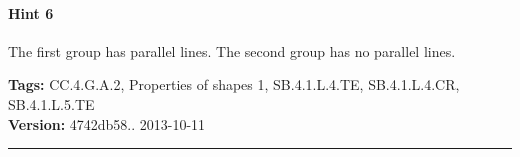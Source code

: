 \documentclass[twocolumn,10pt]{article}
\begin{document}
\paragraph{Hint 6}The first group has parallel lines.  The second group has no parallel lines.



\medskip
\noindent
\textbf{Tags:} {\footnotesize CC.4.G.A.2, Properties of shapes 1, SB.4.1.L.4.TE, SB.4.1.L.4.CR, SB.4.1.L.5.TE}\\
\textbf{Version:} 4742db58.. 2013-10-11
\smallskip\hrule



\end{document}

